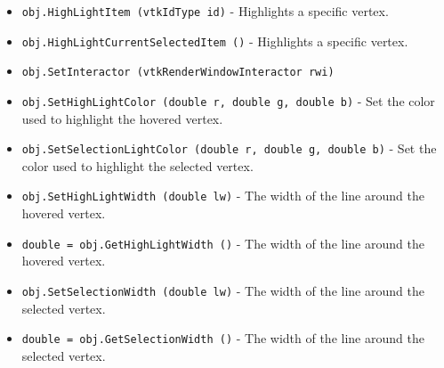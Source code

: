 \begin{itemize}
\item  \verb|obj.HighLightItem (vtkIdType id)| -  Highlights a specific vertex.

\item  \verb|obj.HighLightCurrentSelectedItem ()| -  Highlights a specific vertex.

\item  \verb|obj.SetInteractor (vtkRenderWindowInteractor rwi)|

\item  \verb|obj.SetHighLightColor (double r, double g, double b)| -  Set the color used to highlight the hovered vertex.

\item  \verb|obj.SetSelectionLightColor (double r, double g, double b)| -  Set the color used to highlight the selected vertex.

\item  \verb|obj.SetHighLightWidth (double lw)| -  The width of the line around the hovered vertex.

\item  \verb|double = obj.GetHighLightWidth ()| -  The width of the line around the hovered vertex.

\item  \verb|obj.SetSelectionWidth (double lw)| -  The width of the line around the selected vertex.

\item  \verb|double = obj.GetSelectionWidth ()| -  The width of the line around the selected vertex.

\end{itemize}
